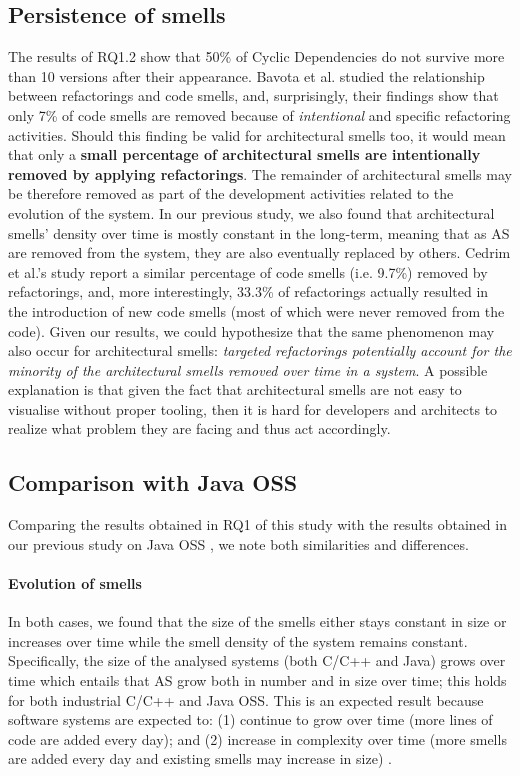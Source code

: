 \subsection{Persistence of smells}
The results of RQ1.2 show that 50\% of Cyclic Dependencies do not survive more than 10 versions after their appearance.
Bavota et al. \cite{Bavota2015} studied the relationship between refactorings and code smells, and, surprisingly, their findings show that only 7\% of code smells are removed because of \emph{intentional} and specific refactoring activities. 
Should this finding be valid for architectural smells too, it would mean that only a \textbf{small percentage of architectural smells are intentionally removed by applying refactorings}.
The remainder of architectural smells may be therefore removed as part of the development activities related to the evolution of the system.
In our previous study, we also found that architectural smells' density over time is mostly constant in the long-term, meaning that as AS are removed from the system, they are also eventually replaced by others.
Cedrim et al.'s study \cite{Cedrim2017} report a similar percentage of code smells (i.e. 9.7\%) removed by refactorings, and, more interestingly, 33.3\% of refactorings actually resulted in the introduction of new code smells (most of which were never removed from the code).
Given our results, we could hypothesize that the same phenomenon may also occur for architectural smells: \emph{targeted refactorings potentially account for the minority of the architectural smells removed over time in a system}.
A possible explanation is that given the fact that architectural smells are not easy to visualise without proper tooling, then it is hard for developers and architects to realize what problem they are facing and thus act accordingly.

\subsection{Comparison with Java OSS}
Comparing the results obtained in RQ1 of this study with the results obtained in our previous study on Java OSS \cite{Sas2019}, we note both similarities and differences.

\paragraph{Evolution of smells}
In both cases, we found that the size of the smells either stays constant in size or increases over time while the smell density of the system remains constant.
Specifically, the size of the analysed systems (both C/C++ and Java) grows over time which entails that AS grow both in number and in size over time; this holds for both industrial C/C++ and Java OSS.
This is an expected result because software systems are expected to: (1) continue to grow over time (more lines of code are added every day); and (2) increase in complexity over time (more smells are added every day and existing smells may increase in size) \cite{Lehman1980}.

